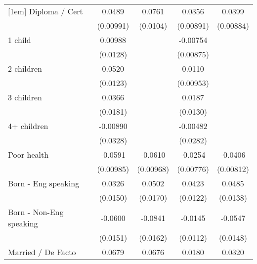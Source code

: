 {\begin{tabular}{l*{4}{c}}
[1em]
Diploma / Cert      &      0.0489\sym{***}&      0.0761\sym{***}&      0.0356\sym{***}&      0.0399\sym{***}\\
                    &   (0.00991)         &    (0.0104)         &   (0.00891)         &   (0.00884)         \\
[1em]
1 child             &     0.00988         &                     &    -0.00754         &                     \\
                    &    (0.0128)         &                     &   (0.00875)         &                     \\
[1em]
2 children          &      0.0520\sym{***}&                     &      0.0110         &                     \\
                    &    (0.0123)         &                     &   (0.00953)         &                     \\
[1em]
3 children          &      0.0366\sym{*}  &                     &      0.0187         &                     \\
                    &    (0.0181)         &                     &    (0.0130)         &                     \\
[1em]
4+ children         &    -0.00890         &                     &    -0.00482         &                     \\
                    &    (0.0328)         &                     &    (0.0282)         &                     \\
[1em]
Poor health         &     -0.0591\sym{***}&     -0.0610\sym{***}&     -0.0254\sym{**} &     -0.0406\sym{***}\\
                    &   (0.00985)         &   (0.00968)         &   (0.00776)         &   (0.00812)         \\
[1em]
Born - Eng speaking &      0.0326\sym{*}  &      0.0502\sym{**} &      0.0423\sym{***}&      0.0485\sym{***}\\
                    &    (0.0150)         &    (0.0170)         &    (0.0122)         &    (0.0138)         \\
[1em]
Born - Non-Eng speaking&     -0.0600\sym{***}&     -0.0841\sym{***}&     -0.0145         &     -0.0547\sym{***}\\
                    &    (0.0151)         &    (0.0162)         &    (0.0112)         &    (0.0148)         \\
[1em]
Married / De Facto  &      0.0679\sym{***}&      0.0676\sym{***}&      0.0180         &      0.0320\sym{**} \\

\end{tabular}}
